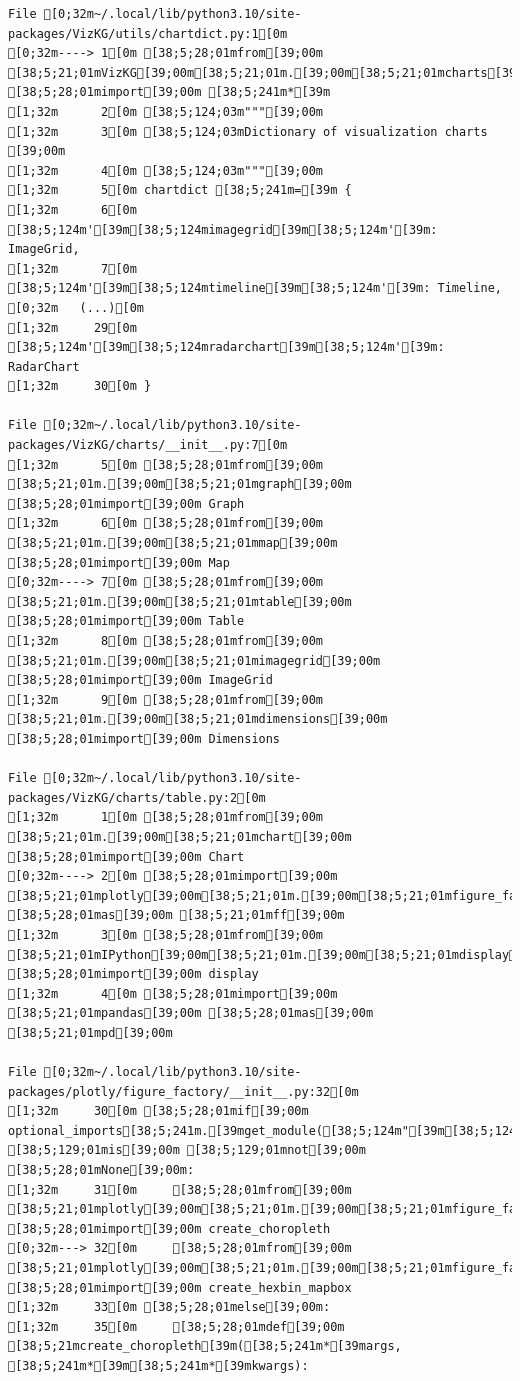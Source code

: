 \documentclass[
  letterpaper,
]{book}
\begin{document}
\begin{verbatim}
File [0;32m~/.local/lib/python3.10/site-packages/VizKG/utils/chartdict.py:1[0m
[0;32m----> 1[0m [38;5;28;01mfrom[39;00m [38;5;21;01mVizKG[39;00m[38;5;21;01m.[39;00m[38;5;21;01mcharts[39;00m [38;5;28;01mimport[39;00m [38;5;241m*[39m
[1;32m      2[0m [38;5;124;03m"""[39;00m
[1;32m      3[0m [38;5;124;03mDictionary of visualization charts [39;00m
[1;32m      4[0m [38;5;124;03m"""[39;00m
[1;32m      5[0m chartdict [38;5;241m=[39m {
[1;32m      6[0m     [38;5;124m'[39m[38;5;124mimagegrid[39m[38;5;124m'[39m: ImageGrid,
[1;32m      7[0m     [38;5;124m'[39m[38;5;124mtimeline[39m[38;5;124m'[39m: Timeline,
[0;32m   (...)[0m
[1;32m     29[0m     [38;5;124m'[39m[38;5;124mradarchart[39m[38;5;124m'[39m: RadarChart
[1;32m     30[0m }

File [0;32m~/.local/lib/python3.10/site-packages/VizKG/charts/__init__.py:7[0m
[1;32m      5[0m [38;5;28;01mfrom[39;00m [38;5;21;01m.[39;00m[38;5;21;01mgraph[39;00m [38;5;28;01mimport[39;00m Graph
[1;32m      6[0m [38;5;28;01mfrom[39;00m [38;5;21;01m.[39;00m[38;5;21;01mmap[39;00m [38;5;28;01mimport[39;00m Map
[0;32m----> 7[0m [38;5;28;01mfrom[39;00m [38;5;21;01m.[39;00m[38;5;21;01mtable[39;00m [38;5;28;01mimport[39;00m Table
[1;32m      8[0m [38;5;28;01mfrom[39;00m [38;5;21;01m.[39;00m[38;5;21;01mimagegrid[39;00m [38;5;28;01mimport[39;00m ImageGrid
[1;32m      9[0m [38;5;28;01mfrom[39;00m [38;5;21;01m.[39;00m[38;5;21;01mdimensions[39;00m [38;5;28;01mimport[39;00m Dimensions

File [0;32m~/.local/lib/python3.10/site-packages/VizKG/charts/table.py:2[0m
[1;32m      1[0m [38;5;28;01mfrom[39;00m [38;5;21;01m.[39;00m[38;5;21;01mchart[39;00m [38;5;28;01mimport[39;00m Chart
[0;32m----> 2[0m [38;5;28;01mimport[39;00m [38;5;21;01mplotly[39;00m[38;5;21;01m.[39;00m[38;5;21;01mfigure_factory[39;00m [38;5;28;01mas[39;00m [38;5;21;01mff[39;00m
[1;32m      3[0m [38;5;28;01mfrom[39;00m [38;5;21;01mIPython[39;00m[38;5;21;01m.[39;00m[38;5;21;01mdisplay[39;00m [38;5;28;01mimport[39;00m display
[1;32m      4[0m [38;5;28;01mimport[39;00m [38;5;21;01mpandas[39;00m [38;5;28;01mas[39;00m [38;5;21;01mpd[39;00m

File [0;32m~/.local/lib/python3.10/site-packages/plotly/figure_factory/__init__.py:32[0m
[1;32m     30[0m [38;5;28;01mif[39;00m optional_imports[38;5;241m.[39mget_module([38;5;124m"[39m[38;5;124mpandas[39m[38;5;124m"[39m) [38;5;129;01mis[39;00m [38;5;129;01mnot[39;00m [38;5;28;01mNone[39;00m:
[1;32m     31[0m     [38;5;28;01mfrom[39;00m [38;5;21;01mplotly[39;00m[38;5;21;01m.[39;00m[38;5;21;01mfigure_factory[39;00m[38;5;21;01m.[39;00m[38;5;21;01m_county_choropleth[39;00m [38;5;28;01mimport[39;00m create_choropleth
[0;32m---> 32[0m     [38;5;28;01mfrom[39;00m [38;5;21;01mplotly[39;00m[38;5;21;01m.[39;00m[38;5;21;01mfigure_factory[39;00m[38;5;21;01m.[39;00m[38;5;21;01m_hexbin_mapbox[39;00m [38;5;28;01mimport[39;00m create_hexbin_mapbox
[1;32m     33[0m [38;5;28;01melse[39;00m:
[1;32m     35[0m     [38;5;28;01mdef[39;00m [38;5;21mcreate_choropleth[39m([38;5;241m*[39margs, [38;5;241m*[39m[38;5;241m*[39mkwargs):


\end{verbatim}
\end{document}
